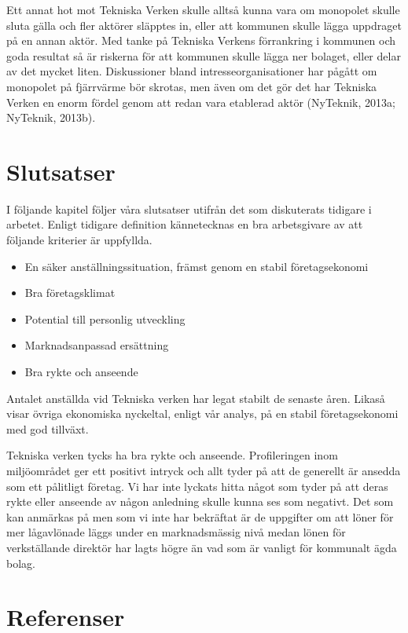\documentclass[10pt,a4paper]{article}
\begin{document}
Ett annat hot mot Tekniska Verken skulle alltså kunna vara om monopolet
skulle sluta gälla och fler aktörer släpptes in, eller att kommunen
skulle lägga uppdraget på en annan aktör. Med tanke på Tekniska Verkens förrankring i kommunen
och goda resultat så är riskerna för att kommunen skulle lägga ner
bolaget, eller delar av det mycket liten. Diskussioner bland
intresseorganisationer har pågått om
monopolet på fjärrvärme bör skrotas, men även om det gör det har
Tekniska Verken en enorm fördel genom att redan vara etablerad aktör
(NyTeknik, 2013a; NyTeknik, 2013b).

\section{Slutsatser}
I följande kapitel följer våra slutsatser utifrån det som diskuterats tidigare i
arbetet. Enligt tidigare definition kännetecknas en bra arbetsgivare av att 
följande kriterier är uppfyllda.

\begin{itemize}
 \item En säker anställningssituation, främst genom en stabil företagsekonomi 
 \item Bra företagsklimat
 \item Potential till personlig utveckling
 \item Marknadsanpassad ersättning
 \item Bra rykte och anseende
\end{itemize}

Antalet anställda vid Tekniska verken har legat stabilt de senaste åren. Likaså
visar övriga ekonomiska nyckeltal, enligt vår analys, på en stabil
företagsekonomi med god tillväxt.

Tekniska verken tycks ha bra rykte och anseende. Profileringen inom miljöområdet
ger ett positivt intryck och allt tyder på att de generellt är ansedda som ett
pålitligt företag. Vi har inte lyckats hitta något som tyder på att deras rykte
eller anseende av någon anledning skulle kunna ses som negativt. Det som kan anmärkas på men som vi inte har bekräftat är de uppgifter om att löner för mer lågavlönade läggs under en marknadsmässig nivå medan lönen för verkställande direktör har lagts högre än vad som är vanligt för kommunalt ägda bolag.

\newpage
\section{Referenser}
\end{document}
